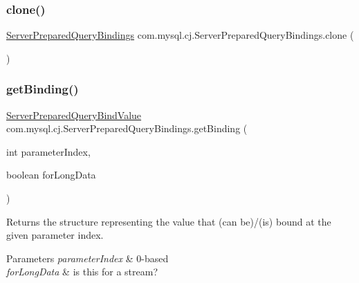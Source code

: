 \subsubsection{\texorpdfstring{clone()}{clone()}}
{\footnotesize\ttfamily \mbox{\hyperlink{classcom_1_1mysql_1_1cj_1_1_server_prepared_query_bindings}{Server\+Prepared\+Query\+Bindings}} com.\+mysql.\+cj.\+Server\+Prepared\+Query\+Bindings.\+clone (\begin{DoxyParamCaption}{ }\end{DoxyParamCaption})}

\mbox{\label{classcom_1_1mysql_1_1cj_1_1_server_prepared_query_bindings_a15f0b3974435b3e95fcbbe4a050fb5d6}} 
\subsubsection{\texorpdfstring{get\+Binding()}{getBinding()}}
{\footnotesize\ttfamily \mbox{\hyperlink{classcom_1_1mysql_1_1cj_1_1_server_prepared_query_bind_value}{Server\+Prepared\+Query\+Bind\+Value}} com.\+mysql.\+cj.\+Server\+Prepared\+Query\+Bindings.\+get\+Binding (\begin{DoxyParamCaption}\item[{int}]{parameter\+Index,  }\item[{boolean}]{for\+Long\+Data }\end{DoxyParamCaption})}

Returns the structure representing the value that (can be)/(is) bound at the given parameter index.


\begin{DoxyParams}{Parameters}
{\em parameter\+Index} & 0-\/based \\
\hline
{\em for\+Long\+Data} & is this for a stream? \\
\hline
\end{DoxyParams}
\mbox{\label{classcom_1_1mysql_1_1cj_1_1_server_prepared_query_bindings_ae8828a315e21c8947dc86d0ef3868f89}} 
